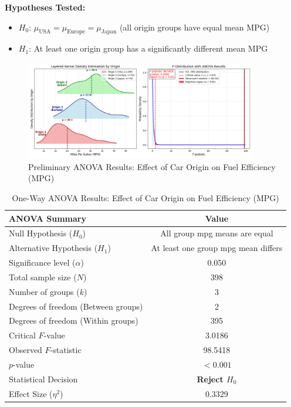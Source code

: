 \documentclass[12pt]{article}
\begin{document}
\textbf{Hypotheses Tested:}
\begin{itemize}
    \item $H_0$: $\mu_{\text{USA}} = \mu_{\text{Europe}} = \mu_{\text{Japan}}$ (all origin groups have equal mean MPG)
    \item $H_1$: At least one origin group has a significantly different mean MPG
\end{itemize}


\begin{figure}[!h]
    \centering
    \includegraphics[width=0.9\textwidth]{../results/anova_origin_mpg.png}
    \caption{Preliminary ANOVA Results: Effect of Car Origin on Fuel Efficiency (MPG)}
    \label{fig:preliminary_anova}
\end{figure}



\begin{table}[h!]
\centering
\caption{One-Way ANOVA Results: Effect of Car Origin on Fuel Efficiency (MPG)}
\label{tab:anova_results}
\begin{tabular}{lc}
\toprule
\textbf{ANOVA Summary} & \textbf{Value} \\
\midrule
Null Hypothesis ($H_0$) & All group mpg means are equal \\
Alternative Hypothesis ($H_1$) & At least one group mpg mean differs \\
Significance level ($\alpha$) & 0.050 \\
\midrule
Total sample size ($N$) & 398 \\
Number of groups ($k$) & 3 \\
Degrees of freedom (Between groups) & 2 \\
Degrees of freedom (Within groups) & 395 \\
Critical $F$-value & 3.0186 \\
Observed $F$-statistic & 98.5418 \\
$p$-value & $< 0.001$ \\
\midrule
Statistical Decision & \textbf{Reject $H_0$} \\
Effect Size ($\eta^2$) & 0.3329 \\
\bottomrule
\end{tabular}
\end{table}
\end{document}
